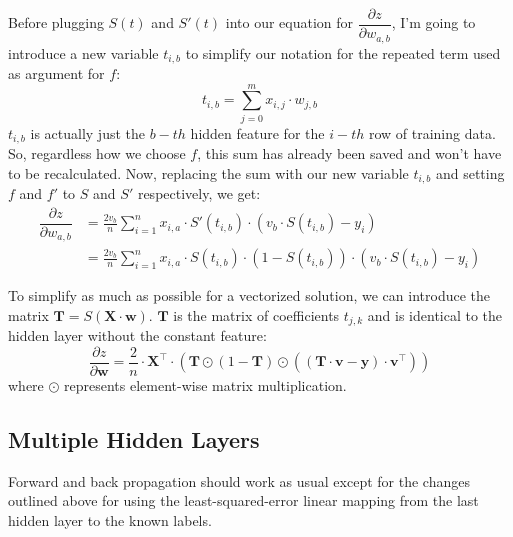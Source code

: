 \documentclass[11pt, oneside]{article}   	%
\begin{document}
 Before plugging $S(t)$ and $S'(t)$ into our equation for $\dfrac{\displaystyle\partial{z}}{\displaystyle\partial{w_{a,b}}}$, I'm going to introduce a new variable $t_{i,b}$ to simplify our notation for the repeated term used as argument for $f$:
 \begin{equation}
 t_{i, b} = \sum_{j=0}^m x_{i,j} \cdot w_{j,b}
 \end{equation}
 $t_{i,b}$ is actually just the $b-th$ hidden feature for the $i-th$ row of training data. So, regardless how we choose $f$, this sum has already been saved and won't have to be recalculated. Now, replacing the sum with our new variable $t_{i,b}$ and setting $f$ and $f'$ to $S$ and $S'$ respectively, we get:
  \begin{align}
 \dfrac{\displaystyle\partial{z}}{\displaystyle\partial{w_{a,b}}} 
&= \frac{2 v_b}{n}  \sum\limits_{i = 1}^n x_{i,a} \cdot S'(t_{i,b}) \cdot (v_b \cdot S(t_{i,b})  - y_i) \\
&= \frac{2 v_b}{n}  \sum\limits_{i = 1}^n x_{i,a} \cdot S(t_{i, b}) \cdot (1 - S(t_{i,b}))\cdot (v_b \cdot S(t_{i,b})  - y_i)
 \end{align}
 
 To simplify as much as possible for a vectorized solution, we can introduce the matrix $\textbf{T} = S(\textbf{X} \cdot \textbf{w})$. $\textbf{T}$ is the matrix of coefficients $t_{j,k}$ and is identical to the hidden layer without the constant feature:
 \begin{equation}
 \dfrac{\displaystyle\partial{z}}{\displaystyle\partial{\textbf{w}}} = \frac{2}{n} \cdot \textbf{X}^\intercal \cdot (\textbf{T} \odot (1 - \textbf{T}) \odot ((\textbf{T} \cdot \textbf{v} - \textbf{y})  \cdot \textbf{v}^\intercal))
 \end{equation}
 where $\odot$ represents element-wise matrix multiplication.
 

\subsection{Multiple Hidden Layers}

Forward and back propagation should work as usual except for the changes outlined above for using the least-squared-error linear mapping from the last hidden layer to the known labels.
\end{document}
